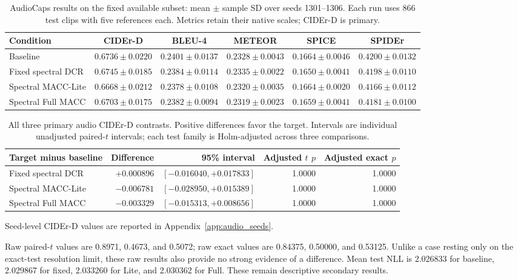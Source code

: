 \documentclass[10pt,a4paper,twocolumn]{article}
\begin{document}
\begin{table}[tbp]
\caption{AudioCaps results on the fixed available subset:
mean $\pm$ sample SD over seeds 1301--1306.
Each run uses 866 test clips with five references each.
Metrics retain their native scales; CIDEr-D is primary.}
\label{tab:audio_final}
\centering\small
\begin{tabularx}{\textwidth}{@{}Yccccc@{}}
\toprule
Condition & CIDEr-D & BLEU-4 & METEOR & SPICE & SPIDEr \\
\midrule
Baseline &
$0.6736\pm0.0220$ & $0.2401\pm0.0137$ &
$0.2328\pm0.0043$ & $0.1664\pm0.0046$ & $0.4200\pm0.0132$ \\
Fixed spectral DCR &
$0.6745\pm0.0185$ & $0.2384\pm0.0114$ &
$0.2335\pm0.0022$ & $0.1650\pm0.0041$ & $0.4198\pm0.0110$ \\
Spectral MACC-Lite &
$0.6668\pm0.0212$ & $0.2378\pm0.0108$ &
$0.2320\pm0.0035$ & $0.1664\pm0.0020$ & $0.4166\pm0.0112$ \\
Spectral Full MACC &
$0.6703\pm0.0175$ & $0.2382\pm0.0094$ &
$0.2319\pm0.0023$ & $0.1659\pm0.0041$ & $0.4181\pm0.0100$ \\
\bottomrule
\end{tabularx}
\end{table}

\begin{table}[tbp]
\caption{All three primary audio CIDEr-D contrasts.
Positive differences favor the target.
Intervals are individual unadjusted paired-$t$ intervals;
each test family is Holm-adjusted across three comparisons.}
\label{tab:audio_contrasts}
\centering\small
\begin{tabularx}{\textwidth}{@{}Yrrrr@{}}
\toprule
Target minus baseline & Difference & 95\% interval &
Adjusted $t$ $p$ & Adjusted exact $p$ \\
\midrule
Fixed spectral DCR &
+0.000896 & $[-0.016040,+0.017833]$ & 1.0000 & 1.0000 \\
Spectral MACC-Lite &
$-0.006781$ & $[-0.028950,+0.015389]$ & 1.0000 & 1.0000 \\
Spectral Full MACC &
$-0.003329$ & $[-0.015313,+0.008656]$ & 1.0000 & 1.0000 \\
\bottomrule
\end{tabularx}
\end{table}


Seed-level CIDEr-D values are reported in Appendix~\ref{app:audio_seeds}.

Raw paired-$t$ values are 0.8971, 0.4673, and 0.5072;
raw exact values are 0.84375, 0.50000, and 0.53125.
Unlike a case resting only on the exact-test resolution limit,
these raw results also provide no strong evidence of a difference.
Mean test NLL is 2.026833 for baseline, 2.029867 for fixed,
2.033260 for Lite, and 2.030362 for Full.
These remain descriptive secondary results.
\end{document}

